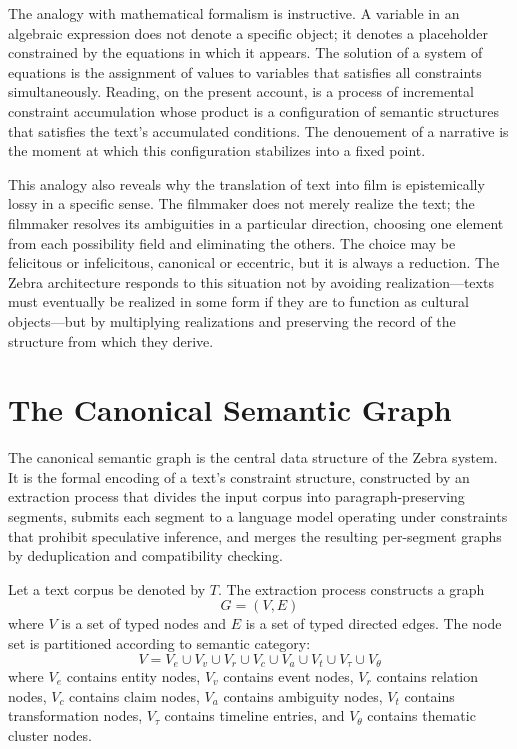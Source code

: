 \documentclass[12pt,a4paper]{article}
\begin{document}
The analogy with mathematical formalism is instructive. A variable in an algebraic expression does not denote a specific object; it denotes a placeholder constrained by the equations in which it appears. The solution of a system of equations is the assignment of values to variables that satisfies all constraints simultaneously. Reading, on the present account, is a process of incremental constraint accumulation whose product is a configuration of semantic structures that satisfies the text's accumulated conditions. The denouement of a narrative is the moment at which this configuration stabilizes into a fixed point.

This analogy also reveals why the translation of text into film is epistemically lossy in a specific sense. The filmmaker does not merely realize the text; the filmmaker resolves its ambiguities in a particular direction, choosing one element from each possibility field and eliminating the others. The choice may be felicitous or infelicitous, canonical or eccentric, but it is always a reduction. The Zebra architecture responds to this situation not by avoiding realization—texts must eventually be realized in some form if they are to function as cultural objects—but by multiplying realizations and preserving the record of the structure from which they derive.

\section{The Canonical Semantic Graph}

The canonical semantic graph is the central data structure of the Zebra system. It is the formal encoding of a text's constraint structure, constructed by an extraction process that divides the input corpus into paragraph-preserving segments, submits each segment to a language model operating under constraints that prohibit speculative inference, and merges the resulting per-segment graphs by deduplication and compatibility checking.

Let a text corpus be denoted by $T$. The extraction process constructs a graph
\[
G = (V, E)
\]
where $V$ is a set of typed nodes and $E$ is a set of typed directed edges. The node set is partitioned according to semantic category:
\[
V = V_e \cup V_v \cup V_r \cup V_c \cup V_a \cup V_t \cup V_\tau \cup V_\theta
\]
where $V_e$ contains entity nodes, $V_v$ contains event nodes, $V_r$ contains relation nodes, $V_c$ contains claim nodes, $V_a$ contains ambiguity nodes, $V_t$ contains transformation nodes, $V_\tau$ contains timeline entries, and $V_\theta$ contains thematic cluster nodes.
\end{document}

